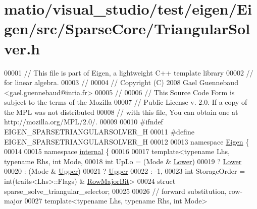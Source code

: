 \hypertarget{matio_2visual__studio_2test_2eigen_2_eigen_2src_2_sparse_core_2_triangular_solver_8h_source}{}\section{matio/visual\+\_\+studio/test/eigen/\+Eigen/src/\+Sparse\+Core/\+Triangular\+Solver.h}
\label{matio_2visual__studio_2test_2eigen_2_eigen_2src_2_sparse_core_2_triangular_solver_8h_source}

\begin{DoxyCode}
00001 \textcolor{comment}{// This file is part of Eigen, a lightweight C++ template library}
00002 \textcolor{comment}{// for linear algebra.}
00003 \textcolor{comment}{//}
00004 \textcolor{comment}{// Copyright (C) 2008 Gael Guennebaud <gael.guennebaud@inria.fr>}
00005 \textcolor{comment}{//}
00006 \textcolor{comment}{// This Source Code Form is subject to the terms of the Mozilla}
00007 \textcolor{comment}{// Public License v. 2.0. If a copy of the MPL was not distributed}
00008 \textcolor{comment}{// with this file, You can obtain one at http://mozilla.org/MPL/2.0/.}
00009 
00010 \textcolor{preprocessor}{#ifndef EIGEN\_SPARSETRIANGULARSOLVER\_H}
00011 \textcolor{preprocessor}{#define EIGEN\_SPARSETRIANGULARSOLVER\_H}
00012 
00013 \textcolor{keyword}{namespace }\hyperlink{namespace_eigen}{Eigen} \{ 
00014 
00015 \textcolor{keyword}{namespace }\hyperlink{namespaceinternal}{internal} \{
00016 
00017 \textcolor{keyword}{template}<\textcolor{keyword}{typename} Lhs, \textcolor{keyword}{typename} Rhs, \textcolor{keywordtype}{int} Mode,
00018   \textcolor{keywordtype}{int} UpLo = (Mode & \hyperlink{group__enums_gga39e3366ff5554d731e7dc8bb642f83cda891792b8ed394f7607ab16dd716f60e6}{Lower})
00019            ? \hyperlink{group__enums_gga39e3366ff5554d731e7dc8bb642f83cda891792b8ed394f7607ab16dd716f60e6}{Lower}
00020            : (Mode & \hyperlink{group__enums_gga39e3366ff5554d731e7dc8bb642f83cda6bcb58be3b8b8ec84859ce0c5ac0aaec}{Upper})
00021            ? \hyperlink{group__enums_gga39e3366ff5554d731e7dc8bb642f83cda6bcb58be3b8b8ec84859ce0c5ac0aaec}{Upper}
00022            : -1,
00023   \textcolor{keywordtype}{int} StorageOrder = int(traits<Lhs>::Flags) & \hyperlink{group__flags_gae4f56c2a60bbe4bd2e44c5b19cbe8762}{RowMajorBit}>
00024 \textcolor{keyword}{struct }sparse\_solve\_triangular\_selector;
00025 
00026 \textcolor{comment}{// forward substitution, row-major}
00027 \textcolor{keyword}{template}<\textcolor{keyword}{typename} Lhs, \textcolor{keyword}{typename} Rhs, \textcolor{keywordtype}{int} Mode>

\end{DoxyCode}
